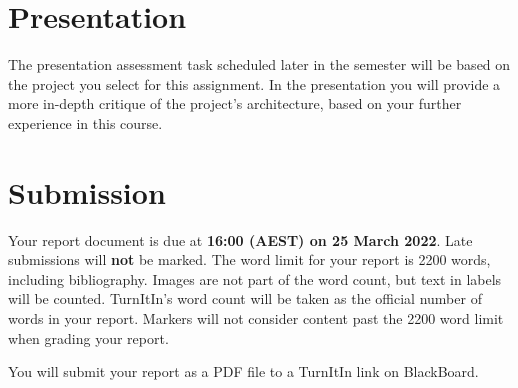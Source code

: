 \documentclass{csse4400}
\begin{document}
\section{Presentation}
The presentation assessment task scheduled later in the semester will be based on the project you select for this assignment.
In the presentation you will provide a more in-depth critique of the project's architecture, based on your further experience in this course.

\section{Submission}
Your report document is due at \textbf{16:00 (AEST) on 25 March 2022}. Late submissions will \textbf{not} be marked.
The word limit for your report is 2200 words, including bibliography.
Images are not part of the word count, but text in labels will be counted.
TurnItIn's word count will be taken as the official number of words in your report.
Markers will not consider content past the 2200 word limit when grading your report.

You will submit your report as a PDF file to a TurnItIn link on BlackBoard.

%
%
%
\end{document}
